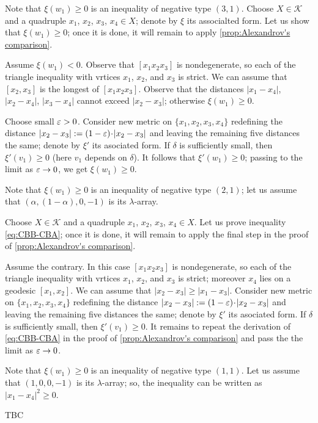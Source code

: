 \documentclass[a4paper,10pt]{article}
\begin{document}
Note that $\xi(w_1)\ge0$ is an inequality of negative type $(3,1)$.
Choose $X\in \mathcal{K}$ and a quadruple $x_1$, $x_2$, $x_3$, $x_4\in X$; denote by $\xi$ its associalted form.
Let us show that $\xi(w_1)\ge0$;
once it is done, it will remain to apply \ref{prop:Alexandrov's comparison}.

Assume $\xi(w_1)<0$.
Observe that $[x_1x_2x_3]$ is nondegenerate, so each of the triangle inequality with vrtices $x_1$, $x_2$, and $x_3$ is strict.
We can assume that $[x_2,x_3]$ is the longest of $[x_1x_2x_3]$.
Observe that the distances $|x_1-x_4|$, $|x_2-x_4|$, $|x_3-x_4|$ cannot exceed $|x_2-x_3|$;
otherwise $\xi(w_1)\ge0$.

Choose small $\varepsilon>0$.
Consider new metric on $\{x_1,x_2,x_3,x_4\}$ redefining the distance $|x_2-x_3|\z{\mathrel{:=}}(1-\eps)\cdot|x_2-x_3|$ and leaving the remaining five distances the same; denote by $\xi'$ its asociated form.
If $\delta$ is sufficiently small, then $\xi'(v_1)\ge0$ (here $v_1$ depends on $\delta$).
It follows that $\xi'(w_1)\ge0$;
passing to the limit as $\varepsilon\to 0$, we get $\xi(w_1)\ge0$.

Note that $\xi(w_1)\ge0$ is an inequality of negative type $(2,1)$;
let us assume that $(\alpha,(1-\alpha), 0,-1)$ is its $\lambda$-array.

Choose $X\in \mathcal{K}$ and a quadruple $x_1$, $x_2$, $x_3$, $x_4\in X$.
Let us prove inequality \ref{eq:CBB-CBA};
once it is done, it will remain to apply the final step in the proof of \ref{prop:Alexandrov's comparison}.

Assume the contrary.
In this case $[x_1x_2x_3]$ is nondegenerate, so each of the triangle inequality with vrtices $x_1$, $x_2$, and $x_3$ is strict; moreover $x_4$ lies on a geodesic $[x_1,x_2]$.
We can assume that $|x_2-x_3|\ge |x_1-x_3|$.
Consider new metric on $\{x_1,x_2,x_3,x_4\}$ redefining the distance $|x_2-x_3|:=(1-\eps)\cdot|x_2-x_3|$ and leaving the remaining five distances the same; denote by $\xi'$ its asociated form.
If $\delta$ is sufficiently small, then $\xi'(v_1)\ge0$.
It remains to repeat the derivation of \ref{eq:CBB-CBA} in the proof of \ref{prop:Alexandrov's comparison} and pass the the limit as $\varepsilon\to 0$.

Note that $\xi(w_1)\ge0$ is an inequality of negative type $(1,1)$.
Let us assume that $(1,0, 0,-1)$ is its $\lambda$-array;
so, the inequality can be written as $|x_1-x_4|^2\ge 0$.

TBC
\qeds
\end{document}
